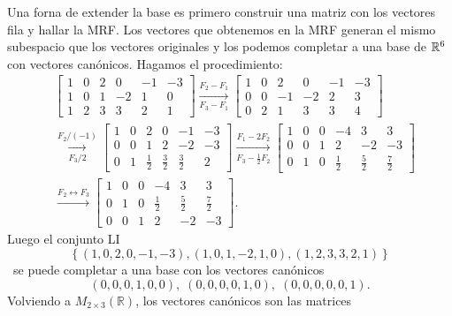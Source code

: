 \begin{enumerate}[resume, topsep=6pt, itemsep=.4cm]
    Una forna de extender la base es primero construir una matriz con los vectores fila y hallar la MRF. Los vectores que obtenemos en la MRF generan el mismo subespacio que los vectores originales y los podemos completar a una base de $\mathbb R^6$ con vectores canónicos. Hagamos el procedimiento: 
    \begin{align*}
    &\begin{bmatrix}
        1 & 0 & 2 & 0 & -1 & -3\\
        1 & 0 & 1 & -2 & 1 & 0\\
        1 & 2 & 3 & 3 & 2 & 1
    \end{bmatrix}
    \underset{F_3-F_1}{\stackrel{F_2-F_1}{\longrightarrow}}
    \begin{bmatrix}
        1 & 0 & 2 & 0 & -1 & -3\\
        0 & 0 & -1 & -2 & 2 & 3\\
        0 & 2 & 1 & 3 & 3 & 4
    \end{bmatrix} \\
    &\underset{F_3/2}{\stackrel{F_2/(-1)}{\longrightarrow}}
    \begin{bmatrix}
        1 & 0 & 2 & 0 & -1 & -3\\
        0 & 0 & 1 & 2 & -2 & -3\\
        0 & 1 & \frac12 & \frac32 & \frac32 & 2
    \end{bmatrix}
    \underset{F_3-\frac12 F_2}{\stackrel{F_1-2F_2}{\longrightarrow}}
    \begin{bmatrix}
        1 & 0 & 0 & -4 & 3 & 3\\
        0 & 0 & 1 & 2 & -2 & -3\\
        0 & 1 & 0 & \frac12 & \frac52 & \frac72
    \end{bmatrix} \\
    &\stackrel{F_2 \leftrightarrow F_3}{\longrightarrow}
    \begin{bmatrix}
        1 & 0 & 0 & -4 & 3 & 3\\
        0 & 1 & 0 & \frac12 & \frac52 & \frac72\\
        0 & 0 & 1 & 2 & -2 & -3
    \end{bmatrix}.
    \end{align*}
    Luego el conjunto LI
    $$
    \left\{(1, 0, 2, 0, -1, -3), (1, 0, 1, -2, 1, 0),  (1, 2, 3, 3, 2, 1)\right\}
    $$ \
    se puede completar a una base con los vectores canónicos 
    $$(0,0,0,1,0,0),\; (0,0,0,0,1,0),\; (0,0,0,0,0,1).$$
    Volviendo a $M_{2\times 3}(\mathbb{R})$, los vectores canónicos son las matrices

\end{enumerate}
